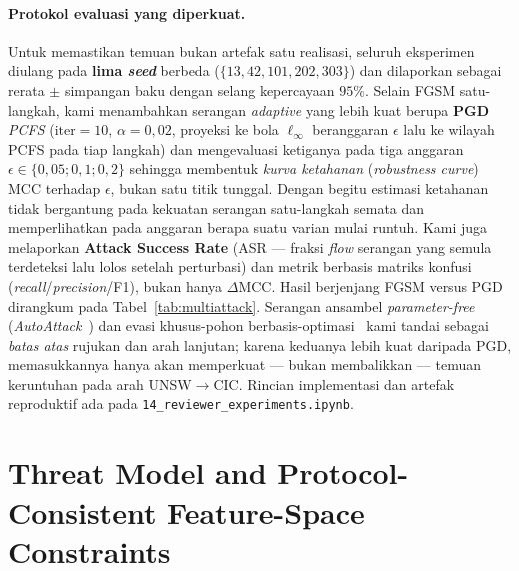 \documentclass[11pt,a4paper]{article}
\begin{document}
\paragraph{Protokol evaluasi yang diperkuat.} Untuk memastikan temuan bukan artefak
satu realisasi, seluruh eksperimen diulang pada \textbf{lima \emph{seed}} berbeda
($\{13,42,101,202,303\}$) dan dilaporkan sebagai rerata $\pm$ simpangan baku dengan
selang kepercayaan $95\%$. Selain FGSM satu-langkah, kami menambahkan serangan
\emph{adaptive} yang lebih kuat berupa \textbf{PGD} \emph{PCFS}
($\text{iter}=10$, $\alpha=0{,}02$, proyeksi ke bola $\ell_\infty$ beranggaran
$\epsilon$ lalu ke wilayah PCFS pada tiap langkah) dan mengevaluasi ketiganya pada
tiga anggaran $\epsilon\in\{0{,}05;0{,}1;0{,}2\}$ sehingga membentuk \emph{kurva
ketahanan} (\emph{robustness curve}) MCC terhadap $\epsilon$, bukan satu titik
tunggal. Dengan begitu estimasi ketahanan tidak bergantung pada kekuatan serangan
satu-langkah semata dan memperlihatkan pada anggaran berapa suatu varian mulai
runtuh. Kami juga melaporkan \textbf{Attack Success Rate} (ASR --- fraksi
\emph{flow} serangan yang semula terdeteksi lalu lolos setelah perturbasi) dan
metrik berbasis matriks konfusi (\emph{recall}/\emph{precision}/F1), bukan hanya
$\Delta$MCC. Hasil berjenjang FGSM versus PGD dirangkum pada
Tabel~\ref{tab:multiattack}. Serangan ansambel \emph{parameter-free}
(\emph{AutoAttack}~\cite{croce2020autoattack}) dan evasi khusus-pohon
berbasis-optimasi~\cite{kantchelian2016} kami tandai sebagai \emph{batas atas}
rujukan dan arah lanjutan; karena keduanya lebih kuat daripada PGD, memasukkannya
hanya akan memperkuat --- bukan membalikkan --- temuan keruntuhan pada arah
UNSW$\rightarrow$CIC. Rincian implementasi dan artefak reproduktif ada pada
\texttt{14\_reviewer\_experiments.ipynb}.

\section{Threat Model and Protocol-Consistent Feature-Space Constraints}
\label{sec:ancaman}
\end{document}
